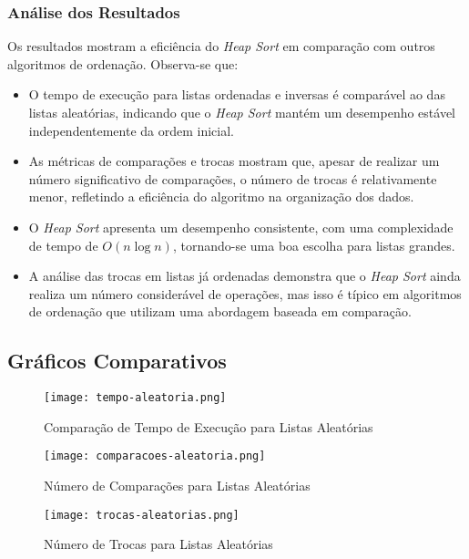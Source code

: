 \documentclass[a4paper,12pt]{article}
\begin{document}
\subsubsection{Análise dos Resultados}

Os resultados mostram a eficiência do \textit{Heap Sort} em comparação com outros algoritmos de ordenação. Observa-se que:

\begin{itemize}
    \item O tempo de execução para listas ordenadas e inversas é comparável ao das listas aleatórias, indicando que o \textit{Heap Sort} mantém um desempenho estável independentemente da ordem inicial.
    \item As métricas de comparações e trocas mostram que, apesar de realizar um número significativo de comparações, o número de trocas é relativamente menor, refletindo a eficiência do algoritmo na organização dos dados.
    \item O \textit{Heap Sort} apresenta um desempenho consistente, com uma complexidade de tempo de $O(n \log n)$, tornando-se uma boa escolha para listas grandes.
    \item A análise das trocas em listas já ordenadas demonstra que o \textit{Heap Sort} ainda realiza um número considerável de operações, mas isso é típico em algoritmos de ordenação que utilizam uma abordagem baseada em comparação.
\end{itemize}

\subsection{Gráficos Comparativos}



    \begin{figure}
        \centering
        \texttt{[image: tempo-aleatoria.png]}
        \caption{Comparação de Tempo de Execução para Listas Aleatórias}
        \label{fig:enter-label}
    \end{figure}

\begin{figure}
    \centering
    \texttt{[image: comparacoes-aleatoria.png]}
    \caption{Número de Comparações para Listas Aleatórias}
    \label{fig:enter-label}
\end{figure}

\begin{figure}
    \centering
    \texttt{[image: trocas-aleatorias.png]}
    \caption{Número de Trocas para Listas Aleatórias}
    \label{fig:enter-label}
\end{figure}
\end{document}
